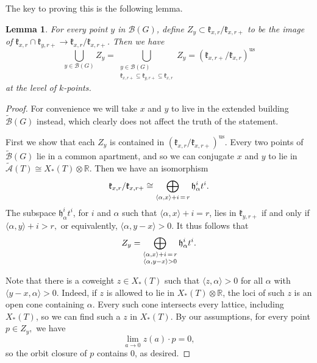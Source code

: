 \documentclass[12pt]{article}
\newcommand{\on}{\operatorname}
\newtheorem{lemma}[theorem]{Lemma}
\theoremstyle{remark}
\begin{document}
The key to proving this is the following lemma.

\begin{lemma}\label{lem:ssvsdepth}
For every point $y$ in $\mathcal{B}(G)$, define $Z_y\subset\mathfrak{k}_{x,r}/\mathfrak{k}_{x,r+}$ to be the image of $\mathfrak{k}_{x,r}\cap\mathfrak{k}_{y,r+}\rightarrow\mathfrak{k}_{x,r}/\mathfrak{k}_{x,r+}$. Then we have
\[
\displaystyle\bigcup_{y\in\mathcal{B}(G)}Z_y=\displaystyle\bigcup_{\substack{y\in\mathcal{B}(G)\\\mathfrak{k}_{x,r+}\subseteq \mathfrak{k}_{y,r+}\subseteq \mathfrak{k}_{x,r}}}Z_y=(\mathfrak{k}_{x,r+}/\mathfrak{k}_{x,r})^{\on{us}}
\]
at the level of $k$-points.
\end{lemma}

\begin{proof}
For convenience we will take $x$ and $y$ to live in the extended building $\widetilde{\mathcal{B}}(G)$ instead, which clearly does not affect the truth of the statement.

First we show that each $Z_y$ is contained in $(\mathfrak{k}_{x,r}/\mathfrak{k}_{x,r+})^{\on{us}}.$ Every two points of $\widetilde{\mathcal{B}}(G)$ lie in a common apartment, and so we can conjugate $x$ and $y$ to lie in $\widetilde{\mathcal{A}}(T)\cong X_*(T)\otimes\mathbb{R}$. Then we have an isomorphism
\[
\mathfrak{k}_{x,r}/\mathfrak{k}_{x,r+}\cong\displaystyle\bigoplus_{\langle\alpha,x\rangle+ i \thinspace=\thinspace r}\mathfrak{h}_{\alpha}^{i}t^i.
\]
The subspace $\mathfrak{h}_{\alpha}^{i}t^i$, for $i$ and $\alpha$ such that $\langle\alpha,x\rangle+ i = r$, lies in $\mathfrak{k}_{y,r+}$ if and only if $\langle\alpha,y\rangle+ i> r,$ or equivalently, $\langle\alpha,y-x\rangle> 0$. It thus follows that
\[
Z_y = \displaystyle\bigoplus_{\substack{\langle\alpha,x\rangle+ i \thinspace=\thinspace r\\ \langle\alpha,y-x\rangle > 0}}\mathfrak{h}_{\alpha}^{i}t^i.
\]

Note that there is a coweight $z\in X_*(T)$ such that $\langle z,\alpha\rangle >0$ for all $\alpha$ with $\langle y-x,\alpha\rangle >0$. Indeed, if $z$ is allowed to lie in $X_*(T)\otimes\mathbb{R}$, the loci of such $z$ is an open cone containing $\alpha$. Every such cone intersects every lattice, including $X_*(T)$, so we can find such a $z$ in $X_*(T)$. By our assumptions, for every point $p\in Z_y,$ we have
\begin{equation}\label{eq:hilbertmumford}
\lim_{a\rightarrow0}z(a)\cdot p=0,
\end{equation}
so the orbit closure of $p$ contains $0$, as desired. 


\end{proof}
\end{document}
